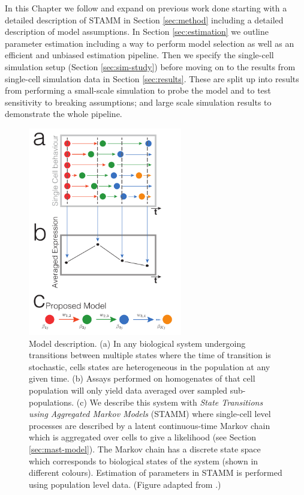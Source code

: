 In this Chapter we follow and expand on previous work done starting with a detailed description of STAMM in Section \ref{sec:method} including a detailed description of model assumptions. In Section \ref{sec:estimation} we outline parameter estimation including a way to perform model selection as well as an efficient and unbiased estimation pipeline. Then we specify the single-cell simulation setup (Section \ref{sec:sim-study})  before moving on to the results from single-cell simulation data in Section \ref{sec:results}. These are split up into results from performing a small-scale simulation to probe the model and to test sensitivity to breaking assumptions; and large scale simulation results to demonstrate the whole pipeline.

\begin{figure}[!t]
  \centering
  \includegraphics[width=0.6\textwidth]{pics/model_fig.pdf}
  \caption{Model description. (a) In any biological system undergoing transitions between multiple states where the time of transition is stochastic, cells states are heterogeneous in the population at any given time.  (b) Assays performed on homogenates of that cell population will only yield data averaged over sampled sub-populations. (c) We describe this system with \emph{State Transitions using Aggregated Markov Models} (STAMM) where single-cell level processes are described by a latent continuous-time Markov chain which is aggregated over cells to give a likelihood (see Section \ref{sec:mast-model}). The Markov chain has a discrete state space which corresponds to biological states of the system (shown in different colours). Estimation of parameters in STAMM is performed using population level data. (Figure adapted from \cite{Armond:2013}.)  }
  \label{fig:model-sketch}
\end{figure}

